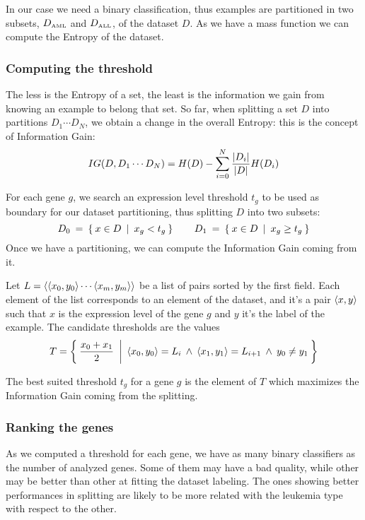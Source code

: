         In our case we need a binary classification, thus examples are
        partitioned in two subsets, $D_{\tiny{\mbox{AML}}}$ and
        $D_{\tiny{\mbox{ALL}}}$, of the dataset $D$. As we have a mass function
        we can compute the Entropy of the dataset.

    \subsubsection{ Computing the threshold }

        The less is the Entropy of a set, the least is the information we
        gain from knowing an example to belong that set. So far, when
        splitting a set $D$ into partitions $D_1 \cdots D_N$, we obtain a
        change in the overall Entropy: this is the concept of Information
        Gain:
        \[
        IG(D, D_1 \cdots D_N) =
            H(D) - \sum_{i = 0}^N \frac{ \left|{D_i}\right| }{ \left|{D}\right| } H(D_i)
        \]

        For each gene $g$, we search an expression level threshold $t_g$
        to be used as boundary for our dataset partitioning, thus
        splitting $D$ into two subsets:
        \[
        D_0 \:=\: \Set{ x \in D \:|\: x_g < t_g }
        \qquad
        D_1 \:=\: \Set{ x \in D \:|\: x_g \geq t_g }
        \]
        Once we have a partitioning, we can compute the Information Gain
        coming from it.

        Let $L = \left \langle {\ensuremath{\left \langle {x_0, y_0} \right \rangle } \cdots \ensuremath{\left \langle {x_m, y_m} \right \rangle }} \right \rangle $ be a
        list of pairs sorted by the first field. Each element of the list
        corresponds to an element of the dataset, and it's a pair
        $\left \langle {x,y} \right \rangle $ such that $x$ is the expression level of the gene
        $g$ and $y$ it's the label of the example. The candidate
        thresholds are the values
        \[
        T = \Set{ \frac{x_0 + x_1}{2} \:|\:
                  \ensuremath{\left \langle {x_0, y_0} \right \rangle } = L_i \:\land\:
                  \ensuremath{\left \langle {x_1, y_1} \right \rangle } = L_{i + 1} \:\land\:
                  y_0 \neq y_1 }
        \]

        The best suited threshold $t_g$ for a gene $g$ is the element of
        $T$ which maximizes the Information Gain coming from the splitting.

    \subsubsection{ Ranking the genes } \label{subsub:Ranking-the-genes}

        As we computed a threshold for each gene, we have as many binary
        classifiers as the number of analyzed genes. Some of them may
        have a bad quality, while other may be better than other at
        fitting the dataset labeling. The ones showing better performances
        in splitting are likely to be more related with the leukemia type
        with respect to the other.


